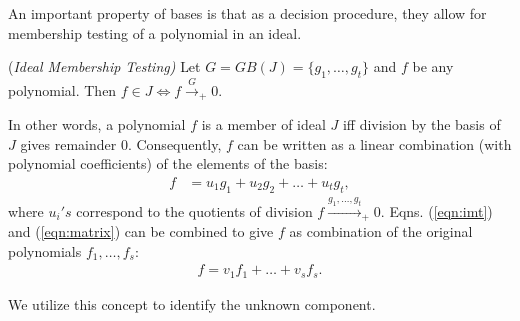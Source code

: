 An important property of \Grobner bases is that as a decision
procedure, they allow for membership testing of a polynomial in an
ideal. 

\begin{Lemma}
\label{lem:imt}
({\it Ideal Membership Testing)
} 
Let $G = GB(J) = \{g_1,\dots,g_t\}$ and $f$ be any polynomial. Then
$f\in J \iff f\xrightarrow{G}_+0$.
\end{Lemma}

In other words, a polynomial $f$ is a member of ideal $J$ iff division
by the \Grobner basis of $J$ gives remainder 0. Consequently, $f$ can
be written as a linear combination (with polynomial coefficients) of
the elements of the \Grobner basis: 
\begin{align}\label{eqn:imt}
f & = u_1g_1 + u_2g_2+ \dots+ u_tg_t,
\end{align}
where $u_i 's$ correspond to the quotients of division
$f\xrightarrow{g_1,\dots,g_t}_+0$. Eqns. (\ref{eqn:imt}) and
(\ref{eqn:matrix}) can be combined to give $f$ as combination of the
original polynomials $f_1,\dots,f_s$:
\begin{align}\label{eqn:imt_orig}
f = v_1f_1 +\dots+v_sf_s.
\end{align}

We utilize this concept to identify the unknown component. 


